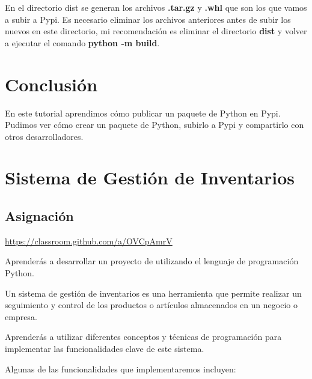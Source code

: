 \documentclass[
  a4paper,
  DIV=11,
  numbers=noendperiod,
  onepage,
  openany]{scrreprt}
\begin{document}
\begin{tcolorbox}
\begin{tcolorbox}[enhanced jigsaw, bottomrule=.15mm, title=\textcolor{quarto-callout-tip-color}{\faLightbulb}\hspace{0.5em}{Tip}, coltitle=black, leftrule=.75mm, left=2mm, colbacktitle=quarto-callout-tip-color!10!white, breakable, colframe=quarto-callout-tip-color-frame, colback=white, opacitybacktitle=0.6, opacityback=0, bottomtitle=1mm, toptitle=1mm, toprule=.15mm, arc=.35mm, titlerule=0mm, rightrule=.15mm]

En el directorio dist se generan los archivos \textbf{.tar.gz} y
\textbf{.whl} que son los que vamos a subir a Pypi. Es necesario
eliminar los archivos anteriores antes de subir los nuevos en este
directorio, mi recomendación es eliminar el directorio \textbf{dist} y
volver a ejecutar el comando \textbf{python -m build}.

\end{tcolorbox}

\chapter{Conclusión}\label{conclusiuxf3n-2}

En este tutorial aprendimos cómo publicar un paquete de Python en Pypi.
Pudimos ver cómo crear un paquete de Python, subirlo a Pypi y
compartirlo con otros desarrolladores.

\chapter{Sistema de Gestión de
Inventarios}\label{sistema-de-gestiuxf3n-de-inventarios}

\section{Asignación}\label{asignaciuxf3n-5}

\url{https://classroom.github.com/a/OVCpAmrV}

Aprenderás a desarrollar un proyecto de utilizando el lenguaje de
programación Python.

Un sistema de gestión de inventarios es una herramienta que permite
realizar un seguimiento y control de los productos o artículos
almacenados en un negocio o empresa.

Aprenderás a utilizar diferentes conceptos y técnicas de programación
para implementar las funcionalidades clave de este sistema.

Algunas de las funcionalidades que implementaremos incluyen:


\end{tcolorbox}
\end{document}
